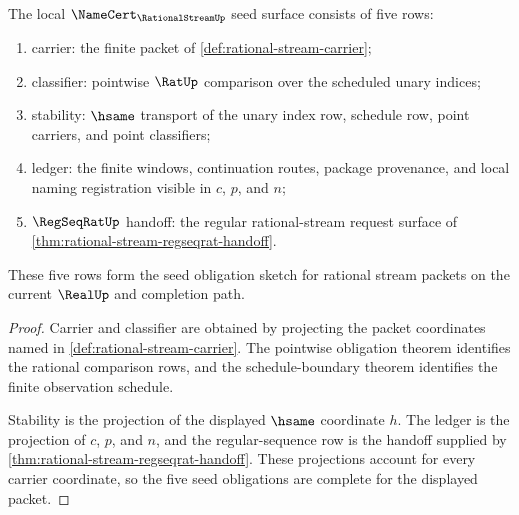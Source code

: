 \begin{theorem}
\label{thm:rational-stream-namecert-seed-obligations}
The local $\NameCert_{\RationalStreamUp}$ seed surface consists of five rows:
\begin{enumerate}
\item carrier: the finite packet of
\autoref{def:rational-stream-carrier};
\item classifier: pointwise $\RatUp$ comparison over the scheduled unary
indices;
\item stability: $\hsame$ transport of the unary index row, schedule row,
point carriers, and point classifiers;
\item ledger: the finite windows, continuation routes, package provenance,
and local naming registration visible in $c$, $p$, and $n$;
\item $\RegSeqRatUp$ handoff: the regular rational-stream request surface of
\autoref{thm:rational-stream-regseqrat-handoff}.
\end{enumerate}
These five rows form the seed obligation sketch for rational stream packets
on the current $\RealUp$ and completion path.
\end{theorem}
\begin{proof}
Carrier and classifier are obtained by projecting the packet coordinates
named in \autoref{def:rational-stream-carrier}. The pointwise obligation
theorem identifies the rational comparison rows, and the schedule-boundary
theorem identifies the finite observation schedule.

Stability is the projection of the displayed $\hsame$ coordinate $h$. The
ledger is the projection of $c$, $p$, and $n$, and the regular-sequence row is
the handoff supplied by
\autoref{thm:rational-stream-regseqrat-handoff}. These projections account
for every carrier coordinate, so the five seed obligations are complete for
the displayed packet.
\end{proof}

